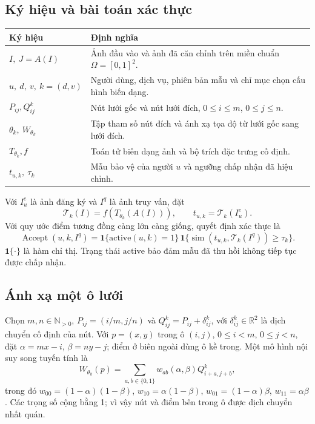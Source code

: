 \documentclass[11pt,a4paper]{article}
\newcommand{\R}{\mathbb{R}}
\newcommand{\Tpl}{\mathcal{T}}
\newcommand{\Score}{\operatorname{sim}}
\newcommand{\Accept}{\operatorname{Accept}}
\begin{document}
\subsection{Ký hiệu và bài toán xác thực}
\begin{tabularx}{\linewidth}{@{}p{.22\linewidth}Y@{}}
\toprule
Ký hiệu & Định nghĩa \\
\midrule
$I,\ J=A(I)$ & Ảnh đầu vào và ảnh đã căn chỉnh trên miền chuẩn $\Omega=[0,1]^2$. \\
$u,\ d,\ v,\ k=(d,v)$ & Người dùng, dịch vụ, phiên bản mẫu và chỉ mục chọn cấu hình biến dạng. \\
$P_{ij},Q_{ij}^{k}$ & Nút lưới gốc và nút lưới đích, $0\leq i\leq m$, $0\leq j\leq n$. \\
$\theta_k,\ W_{\theta_k}$ & Tập tham số nút đích và ánh xạ tọa độ từ lưới gốc sang lưới đích. \\
$T_{\theta_k}, f$ & Toán tử biến dạng ảnh và bộ trích đặc trưng cố định. \\
$t_{u,k},\ \tau_k$ & Mẫu bảo vệ của người $u$ và ngưỡng chấp nhận đã hiệu chỉnh. \\
\bottomrule
\end{tabularx}
Với $I_u^e$ là ảnh đăng ký và $I^q$ là ảnh truy vấn, đặt
\begin{equation}\label{eq:template}
 \Tpl_k(I)=f\!\left(T_{\theta_k}(A(I))\right),\qquad
 t_{u,k}=\Tpl_k(I_u^e).
\end{equation}
Với quy ước điểm tương đồng càng lớn càng giống, quyết định xác thực là
\begin{equation}\label{eq:decision}
 \Accept(u,k,I^q)=
 \mathbf{1}\{\mathrm{active}(u,k)=1\}\,
 \mathbf{1}\{\Score(t_{u,k},\Tpl_k(I^q))\geq\tau_k\}.
\end{equation}
$\mathbf{1}\{\cdot\}$ là hàm chỉ thị. Trạng thái $\mathrm{active}$ bảo đảm mẫu đã thu hồi không tiếp tục được chấp nhận.

\subsection{Ánh xạ một ô lưới}
Chọn $m,n\in\mathbb{N}_{>0}$, $P_{ij}=(i/m,j/n)$ và $Q_{ij}^k=P_{ij}+\delta_{ij}^k$, với $\delta_{ij}^k\in\R^2$ là dịch chuyển cố định của nút. Với $p=(x,y)$ trong ô $(i,j)$, $0\leq i<m$, $0\leq j<n$, đặt $\alpha=mx-i$, $\beta=ny-j$; điểm ở biên ngoài dùng ô kề trong. Một mô hình nội suy song tuyến tính là
\begin{equation}\label{eq:warp}
 W_{\theta_k}(p)=\sum_{a,b\in\{0,1\}}w_{ab}(\alpha,\beta)Q_{i+a,j+b}^{k},
\end{equation}
trong đó $w_{00}=(1-\alpha)(1-\beta)$, $w_{10}=\alpha(1-\beta)$, $w_{01}=(1-\alpha)\beta$, $w_{11}=\alpha\beta$. Các trọng số cộng bằng 1; vì vậy nút và điểm bên trong ô được dịch chuyển nhất quán.
\end{document}
